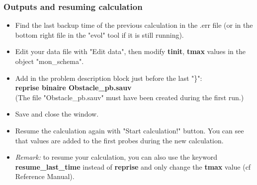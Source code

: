 \documentclass[10pt, hyperref={unicode=true,pdfusetitle, bookmarks=true,bookmarksnumbered=false,bookmarksopen=false, breaklinks=false,pdfborder={0 0l 1},backref=true,colorlinks=true,linkcolor=darkblue,pageanchor}]{beamer}
\begin{document}
\begin{frame}
\frametitle{Outputs and resuming calculation}
\begin{block}{}

\begin{itemize}
\item Find the last backup time of the previous calculation in the .err file (or in the bottom right file in the "evol" tool if it is still running).

\item \label{save_restart} Edit your data file with "Edit data", then modify \textbf{tinit}, \textbf{tmax} values in the object "mon\_schema".

\item Add in the problem description block just before the last "\}":\\
\textbf{reprise binaire Obstacle\_pb.sauv}\\
(The file "Obstacle\_pb.sauv" must have been created during the first run.)

\item Save and close the window.

\item Resume the calculation again with "Start calculation!" button. You can see that values are added to the first probes during the new calculation.

\item [$\color{green}\Rightarrow$] \textit{Remark:} to resume your calculation, you can also use the keyword \textbf{resume\_last\_time} instead of \textbf{reprise} and only change the \textbf{tmax} value (cf Reference Manual).
\end{itemize}

\end{block}
\end{frame}
\end{document}
